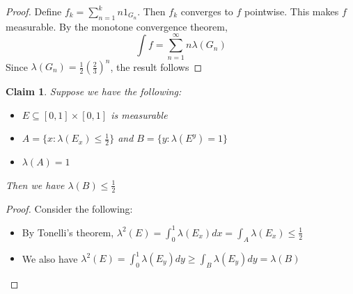 \documentclass[a4paper,11pt]{article}
\newtheorem{claim}{Claim}
\begin{document}
\begin{proof}
  Define $f_k = \sum_{n=1}^k n1_{G_n}$. Then $f_k$ converges to $f$ pointwise. 
  This makes $f$ measurable. By the monotone convergence theorem, \[\int f = \sum_{n=1}^\infty n\lambda(G_n)\]
  Since $\lambda(G_n)=\frac{1}{2}(\frac{2}{3})^n$, the result follows
\end{proof}

\begin{claim}
  Suppose we have the following:
  
  \begin{itemize}
    \item $E \subseteq [0,1] \times [0,1]$ is measurable 
    \item $A=\{x:\lambda(E_x)\leq\frac{1}{2}\}$ and $B=\{y:\lambda(E^y)=1\}$
    \item $\lambda(A)=1$ 
  \end{itemize}
  
  Then we have $\lambda(B) \leq \frac{1}{2}$
\end{claim}

\begin{proof}
  Consider the following:
  \begin{itemize}
    \item By Tonelli's theorem, $\lambda^2(E)=\int_0^1 \lambda(E_x)dx = \int_A \lambda(E_x) \leq \frac{1}{2}$
    \item We also have $\lambda^2(E)= \int_0^1 \lambda(E_y)dy \geq \int_B \lambda(E_y)dy = \lambda(B)$
  \end{itemize}
\end{proof}
\end{document}
